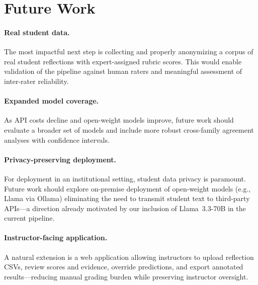 \documentclass[11pt]{article}
\begin{document}

\section{Future Work}

\paragraph{Real student data.}
The most impactful next step is collecting and properly anonymizing a corpus of real student reflections with expert-assigned rubric scores. This would enable validation of the pipeline against human raters and meaningful assessment of inter-rater reliability.

\paragraph{Expanded model coverage.}
As API costs decline and open-weight models improve, future work should evaluate a broader set of models and include more robust cross-family agreement analyses with confidence intervals.

\paragraph{Privacy-preserving deployment.}
For deployment in an institutional setting, student data privacy is paramount. Future work should explore on-premise deployment of open-weight models (e.g., Llama via Ollama) eliminating the need to transmit student text to third-party APIs—a direction already motivated by our inclusion of Llama~3.3-70B in the current pipeline.

\paragraph{Instructor-facing application.}
A natural extension is a web application allowing instructors to upload reflection CSVs, review scores and evidence, override predictions, and export annotated results—reducing manual grading burden while preserving instructor oversight.
\end{document}
